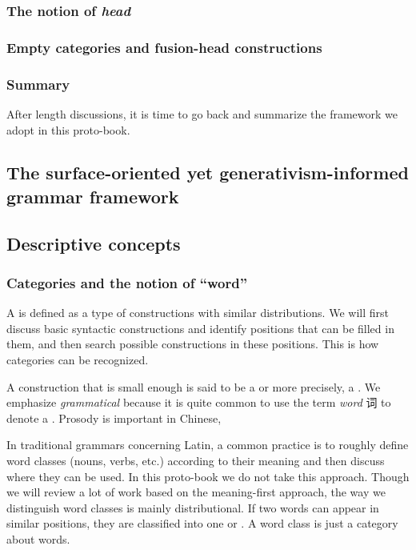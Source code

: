 \documentclass[../main.tex]{subfiles}
\begin{document}
\subsubsection{The notion of \emph{head}}

\subsubsection{Empty categories and fusion-head constructions}

\subsubsection{Summary}

After length discussions, it is time to go back and summarize the framework we adopt in this proto-book.

\subsection{The surface-oriented yet generativism-informed grammar framework} 

\subsection{Descriptive concepts}


\subsubsection{Categories and the notion of ``word''}

A  is defined as a type of constructions with similar distributions.
We will first discuss basic syntactic constructions and identify positions that can be filled in them, 
and then search possible constructions in these positions. This is how categories can be recognized.

A construction that is small enough is said to be a  or more precisely, 
a .
We emphasize \emph{grammatical} because it is quite common to use the term \emph{word} 词 to denote 
a . Prosody is important in Chinese, %

In traditional grammars concerning Latin, a common practice is to roughly define word classes (nouns, verbs, etc.) 
according to their meaning and then discuss where they can be used. 
In this proto-book we do not take this approach. Though we will review a lot of work based on the meaning-first 
approach, the way we distinguish word classes is mainly distributional. If two words can appear in similar
positions, they are classified into one  or .
A word class is just a category about words.  
\end{document}
